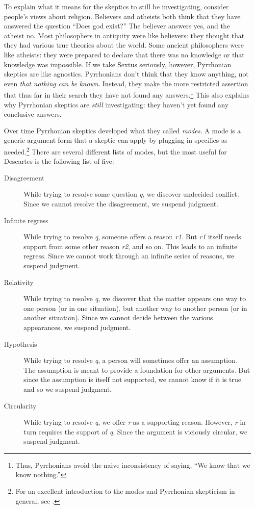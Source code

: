To explain what it means for the skeptics to still be investigating, consider people's views about religion. Believers and atheists both think that they have answered the question ``Does god exist?'' The believer answers yes, and the atheist no. Most philosophers in antiquity were like believers: they thought that they had various true theories about the world. Some ancient philosophers were like atheists: they were prepared to declare that there was no knowledge or that knowledge was impossible. If we take Sextus seriously, however, Pyrrhonian skeptics are like agnostics. Pyrrhonians don't think that they know anything, not even \textit{that nothing can be known}. Instead, they make the more restricted assertion that thus far in their search they have not found any answers.\footnote{Thus, Pyrrhonians avoid the naive inconsistency of saying, ``We know that we know nothing.''} This also explains why Pyrrhonian skeptics are \textit{still} investigating: they haven't yet found any conclusive answers.

Over time Pyrrhonian skeptics developed what they called \textit{modes}. A mode is a generic argument form that a skeptic can apply by plugging in specifics as needed.\footnote{For an excellent introduction to the modes and Pyrrhonian skepticism in general, see \textcite{annasbarnes1994}.} There are several different lists of modes, but the most useful for Descartes is the following list of five:

\begin{description}
    \item[Disagreement] While trying to resolve some question \textit{q}, we discover undecided conflict. Since we cannot resolve the disagreement, we suspend judgment.
    \item[Infinite regress] While trying to resolve \textit{q}, someone offers a reason \textit{r1}. But \textit{r1} itself needs support from some other reason \textit{r2}, and so on. This leads to an infinite regress. Since we cannot work through an infinite series of reasons, we suspend judgment.
    \item[Relativity] While trying to resolve \textit{q}, we discover that the matter appears one way to one person (or in one situation), but another way to another person (or in another situation). Since we cannot decide between the various appearances, we suspend judgment.
    \item[Hypothesis] While trying to resolve \textit{q}, a person will sometimes offer an assumption. The assumption is meant to provide a foundation for other arguments. But since the assumption is itself not supported, we cannot know if it is true and so we suspend judgment.
    \item[Circularity] While trying to resolve \textit{q}, we offer \textit{r} as a supporting reason. However, \textit{r} in turn requires the support of \textit{q}. Since the argument is viciously circular, we suspend judgment.
\end{description}

